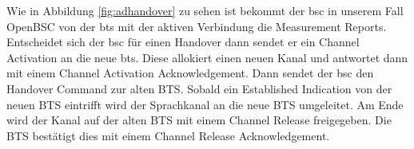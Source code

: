 Wie in Abbildung \ref{fig:adhandover} zu sehen ist bekommt der \gls{bsc} in unserem Fall OpenBSC von der \gls{bts} mit der aktiven Verbindung die Measurement Reports. Entscheidet sich der \gls{bsc} für einen Handover dann sendet er ein Channel Activation an die neue \gls{bts}. Diese allokiert einen neuen Kanal und antwortet dann mit einem Channel Activation Acknowledgement. Dann sendet der \gls{bsc} den Handover Command zur alten BTS. Sobald ein Established Indication von der neuen BTS eintrifft wird der Sprachkanal an die neue BTS umgeleitet. Am Ende wird der Kanal auf der alten BTS mit einem Channel Release freigegeben. Die BTS bestätigt dies mit einem Channel Release Acknowledgement. 

\begin{lstlisting}

\end{lstlisting}





